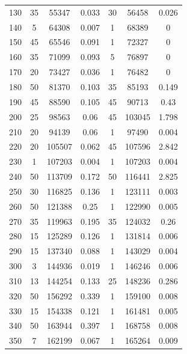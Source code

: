 \documentclass[a4paper,12pt]{article}
\begin{document}
\begin{center}
\begin{longtable}{|c|c|c|c|c|c|c|}
130   &   35   &   55347   &   0.033   &   30   &   56458   &   0.026  \\
140   &   5   &   64308   &   0.007   &   1   &   68389   &   0  \\
150   &   45   &   65546   &   0.091   &   1   &   72327   &   0  \\
160   &   35   &   71099   &   0.093   &   5   &   76897   &   0  \\
170   &   20   &   73427   &   0.036   &   1   &   76482   &   0  \\
180   &   50   &   81370   &   0.103   &   35   &   85193   &   0.149  \\
190   &   45   &   88590   &   0.105   &   45   &   90713   &   0.43  \\
200   &   25   &   98563   &   0.06   &   45   &   103045   &   1.798  \\
210   &   20   &   94139   &   0.06   &   1   &   97490   &   0.004  \\
220   &   20   &   105507   &   0.062   &   45   &   107596   &   2.842  \\
230   &   1   &   107203   &   0.004   &   1   &   107203   &   0.004  \\
240   &   50   &   113709   &   0.172   &   50   &   116441   &   2.825  \\
250   &   30   &   116825   &   0.136   &   1   &   123111   &   0.003  \\
260   &   50   &   121388   &   0.25   &   1   &   122990   &   0.005  \\
270   &   35   &   119963   &   0.195   &   35   &   124032   &   0.26  \\
280   &   15   &   125289   &   0.126   &   1   &   131814   &   0.006 \\  
290   &   15   &   137340   &   0.088   &   1   &   143029   &   0.004  \\
300   &   3   &   144936   &   0.019   &   1   &   146246   &   0.006 \\
310   &   13   &   144254   &   0.133   &   25   &   148236   &   0.286 \\
320   &   50   &   156292   &   0.339   &   1   &   159100   &   0.008  \\ 
330   &   15   &   154338   &   0.121   &   1   &   161481   &   0.005  \\
340   &   50   &   163944   &   0.397   &   1   &   168758   &   0.008  \\
350   &   7   &   162199   &   0.067   &   1   &   165264   &   0.009  \\

\end{longtable}
\end{center}
\end{document}
